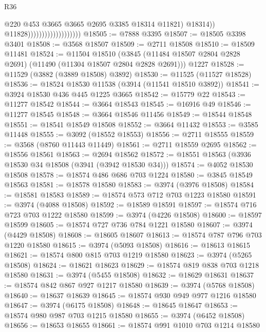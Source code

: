 \begin{lexlean}{R36}
\begin{coremodule}
                                                @220
                                                @453
                                                @3665
                                                @3665
                                                @2695
                                                @3385
                                                @18314
                                                @11821)
                                              @18314))
                                          @11828)))))))))))))))))))
@18505 := @7888 @3395
@18507 := @18505 @3398 @3401
@18508 := @3568 @18507
@18509 := @2711 @18508
@18510 := @18509 @11481
@18524 := @11504
    @18510
    (@3845 (@11484 @18507 @2804 @2828 @2691) (@11490 (@11304 @18507 @2804 @2828 @2691)))
    @1227
@18528 := @11529 (@3882 (@3889 @18508) @3892)
@18530 := @11525 (@11527 @18528)
@18536 := @18524 @18530 @11538 (@3914 (@11541 @18510 @3892))
@18541 := @3924 @18530 @436 @445 @1225 @3665
@18542 := @15779 @22
@18543 := @11277 @18542
@18544 := @3664 @18543
@18545 := @16916 @49
@18546 := @11277 @18545
@18548 := @3664 @18546 @11456
@18549 := @18544 @18548
@18551 := @18541 @18549 @18508
@18552 := @3664 @11432
@18553 := @3585 @11448
@18555 := @3092 (@18552 @18553)
@18556 := @2711 @18555
@18559 := @3568 (@8760 @11443 @11449)
@18561 := @2711 @18559 @2695
@18562 := @18556 @18561
@18563 := @2694 @18562
@18572 := @18551 @18563 (@3936 @18530 @34 @18508 (@3941 (@3942 @18530 @34)))
@18574 := @4052 @18530 @18508
@18578 := @18574 @486 @686 @703 @1224
@18580 := @3845 @18549 @18563
@18581 := @18578 @18580
@18583 := @3974 (@3976 @18508)
@18584 := @18581 @18583
@18589 := @18574 @573 @712 @703 @1223 @18580
@18591 := @3974 (@4088 @18508)
@18592 := @18589 @18591
@18597 := @18574 @716 @723 @703 @1222 @18580
@18599 := @3974 (@4226 @18508)
@18600 := @18597 @18599
@18605 := @18574 @727 @736 @784 @1221 @18580
@18607 := @3974 (@4429 @18508)
@18608 := @18605 @18607
@18613 := @18574 @787 @796 @703 @1220 @18580
@18615 := @3974 (@5093 @18508)
@18616 := @18613 @18615
@18621 := @18574 @800 @815 @703 @1219 @18580
@18623 := @3974 (@5265 @18508)
@18624 := @18621 @18623
@18629 := @18574 @819 @838 @703 @1218 @18580
@18631 := @3974 (@5455 @18508)
@18632 := @18629 @18631
@18637 := @18574 @842 @867 @927 @1217 @18580
@18639 := @3974 (@5768 @18508)
@18640 := @18637 @18639
@18645 := @18574 @930 @949 @977 @1216 @18580
@18647 := @3974 (@6175 @18508)
@18648 := @18645 @18647
@18653 := @18574 @980 @987 @703 @1215 @18580
@18655 := @3974 (@6452 @18508)
@18656 := @18653 @18655
@18661 := @18574 @991 @1010 @703 @1214 @18580

\end{coremodule}
\end{lexlean}
